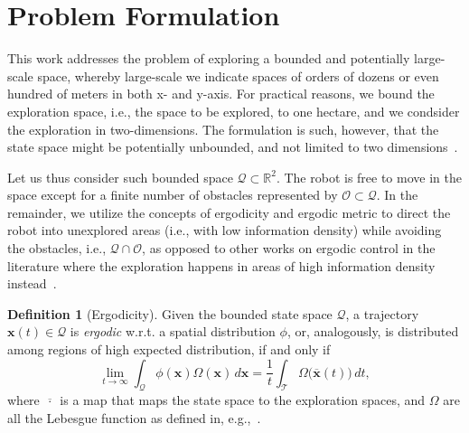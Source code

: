 \documentclass[letterpaper,10pt,conference,twoside]{IEEEtran}
\theoremstyle{definition}
\newtheorem{defn}{Definition}[section]
\begin{document}
\section{Problem Formulation}\label{sec:pb}
\noindent
This work addresses the problem of exploring a bounded and potentially large-scale space, whereby large-scale we indicate spaces of orders of dozens or even hundred of meters in both x- and y-axis. For practical reasons, we bound the exploration space, i.e., the space to be explored, to one hectare, and we condsider the exploration in two-dimensions. The formulation is such, however, that the state space might be potentially unbounded, and not limited to two dimensions~\cite{dong2023time}.

Let us thus consider such bounded space $\mathcal{Q}\subset\mathbb{R}^2$. The robot is free to move in the space except for a finite number of obstacles represented by $\mathcal{O}\subset\mathcal{Q}$.  
In the remainder, we utilize the concepts of ergodicity and ergodic metric to direct the robot into unexplored areas (i.e., with low information density) while avoiding the obstacles, i.e., $\mathcal{Q}\cap\mathcal{O}$, as opposed to other works on ergodic control in the literature where the exploration happens in areas of high information density instead~\cite{mathew2011metrics,abraham2017ergodic,miller2013trajectory}.
\begin{defn}[Ergodicity]
  Given the bounded state space $\mathcal{Q}$, a trajectory $\mathbf{x}(t)\in\mathcal{Q}$ is \textit{ergodic} w.r.t. a spatial distribution $\phi$, or, analogously, is distributed among regions of high expected distribution, if and only if
  \begin{equation}
    \lim_{t\rightarrow\infty}{\int_{\mathcal{Q}}\phi(\mathbf{x})\Omega(\mathbf{x})\,d\mathbf{x}=\frac{1}{t}\int_{\mathcal{T}}{{\Omega\big(\overline{\mathbf{x}}(t)\big)}}\,dt},
  \end{equation}
  where $\overline{\,\cdot\,}$ is a map that maps the state space to the exploration spaces, and $\Omega$ are all the Lebesgue function as defined in, e.g.,~\cite{mathew2011metrics}.
\end{defn}
\end{document}
